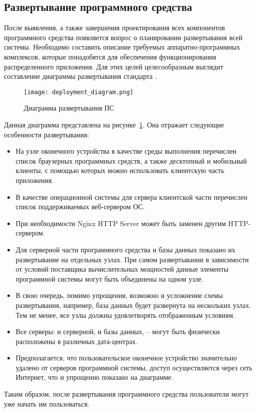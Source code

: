 \subsection{Развертывание программного средства}
\label{sec:design:deployment}

После выявления, а также завершения проектирования всех компонентов программного средства появляется вопрос о планировании развертывания всей системы. Необходимо составить описание требуемых аппаратно-программных комплексов, которые понадобятся для обеспечения функционирования распределенного приложения. Для этих целей целесообразным выглядит составление диаграммы развертывания стандарта \uml. 

\begin{figure}[!ht]
\centering
	\texttt{[image: deployment\_diagram.png]}
	\caption{Диаграмма развертывания ПС}
	\label{fig:design:deployment:diagram}
\end{figure}

Данная диаграмма представлена на рисунке~\ref{fig:design:deployment:diagram}. Она отражает следующие особенности развертывания:

\begin{itemize}
	\item На узле оконечного устройства в качестве среды выполнения перечислен список браузерных программных средств, а также десктопный и мобильный клиенты, с помощью которых можно использовать клиентскую часть приложения.
	\item В качестве операционной системы для сервера клиентской части перечислен список поддерживаемых веб-сервером ОС.
	\item При необходимости Nginx HTTP Server может быть заменен другим HTTP-сервером.
	\item Для серверной части программного средства и базы данных показано их развертывание на отдельных узлах. При самом развертывании в зависимости от условий поставщика вычислительных мощностей данные элементы программной системы могут быть объединены на одном узле.
	\item В свою очередь, помимо упрощения, возможно и усложнение схемы развертывания, например, база данных будет развернута на нескольких узлах. Тем не менее, все узлы должны удовлетворять отображенным условиям.
	\item Все серверы:  и серверной, и базы данных, -- могут быть физически расположены в различных дата-центрах.
	\item Предполагается, что пользовательское оконечное устройство зна\-чи\-те\-льно удалено от серверов программной системы, доступ осуществляется через сеть Интернет, что и упрощенно показано на диаграмме.
\end{itemize}

Таким образом, после развертывания программного средства пользователи могут уже начать им пользоваться.
